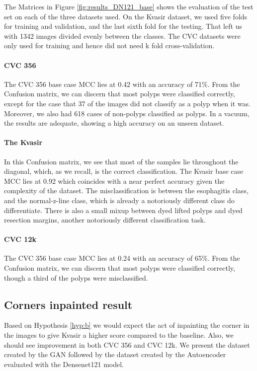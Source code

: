 \noindent
The Matrices in Figure \ref{fig:results_DN121_base} shows the evaluation of the test set on each of the three datasets used. 
On the Kvasir dataset, we used five folds for training and validation, and the last sixth fold for the testing. That left us with 1342 images divided evenly between the classes. The CVC datasets were only used for training and hence did not need k fold cross-validation.

\paragraph{CVC 356}
The CVC 356 base case MCC lies at 0.42 with an accuracy of 71\%. 
From the Confusion matrix, we can discern that most polyps were classified correctly, except for the case that 37 of the images did not classify as a polyp when it was. Moreover, we also had 618 cases of non-polyps classified as polyps.
In a vacuum, the results are adequate, showing a high accuracy on an unseen dataset.  

\paragraph{The Kvasir}
In this Confusion matrix, we see that most of the samples lie throughout the diagonal, which, as we recall, is the correct classification. 
The Kvasir base case MCC lies at 0.92 which coincides with a near perfect accuracy given the complexity of the dataset. 
The misclassification is between the esophagitis class, and the normal-z-line class, which is already a notoriously different class do differentiate.
There is also a small mixup between dyed lifted polyps and dyed resection margins, another notoriously different classification task. 


\paragraph{CVC 12k}
The CVC 356 base case MCC lies at 0.24 with an accuracy of 65\%. 
From the Confusion matrix, we can discern that most polyps were classified correctly, though a third of the polyps were misclassified.




\FloatBarrier
\subsection{Corners inpainted result}
Based on Hypothesis \ref{hyp:b} we would expect the act of inpainting the corner in the images to give Kvasir a higher score compared to the baseline. Also, we should see improvement in both CVC 356 and CVC 12k.
We present the dataset created by the  GAN followed by the dataset created by the Autoencoder evaluated with the Densenet121 model.

